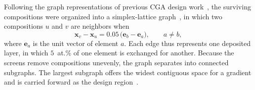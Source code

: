 Following the graph representations of previous CGA design
work~\cite{multiterminalCGA2024,obrist2026graph}, the surviving compositions were
organized into a simplex-lattice graph~\cite{nimplex}, in which two compositions
\(u\) and \(v\) are neighbors when
\begin{equation}
\mathbf{x}_v-\mathbf{x}_u = 0.05\,\bigl(\mathbf{e}_b-\mathbf{e}_a\bigr), \qquad a \neq b,
\label{eq:edge}
\end{equation}
where \(\mathbf{e}_a\) is the unit vector of element \(a\). Each edge thus
represents one deposited layer, in which \(5\)~at.\% of one element is exchanged
for another. Because the screens remove compositions unevenly, the graph separates
into connected subgraphs. The largest subgraph offers the widest contiguous space
for a gradient and is carried forward as the design
region~\cite{obrist2026graph}.

